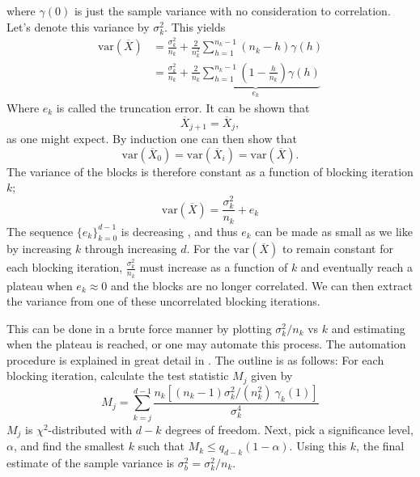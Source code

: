 \documentclass[
    a4paper, aps, twocolumn, floatfix, superscriptaddress,
    nofootinbib]{revtex4-1}
\begin{document}
where $\gamma(0)$ is just the sample variance with no consideration to correlation. Let's denote this variance by $\sigma_k^2$. This yields
\begin{align}
 \text{var}(\overline{X}) &= \frac{\sigma_k^2}{n_k} + \frac{2}{n_k^2} \sum_{h=1}^{n_k-1} (n_k-h)\gamma(h) \\
 &= \frac{\sigma_k^2}{n_k} + \underbrace{\frac{2}{n_k} \sum_{h=1}^{n_k-1}\left(1-\frac{h}{n_k} \right) \gamma(h)}_{e_k}
\end{align}
 Where $e_k$ is called the truncation error. It can be shown that \cite{Stat.Phys.}
 \begin{equation}
     \overline{X}_{j+1} = \overline{X}_{j},
 \end{equation}
 as one might expect. By induction one can then show that 
 \begin{equation}
     \text{var}(\overline{X}_0) = \text{var}(\overline{X}_i) = \text{var}(\overline{X}).
 \end{equation}
 The variance of the blocks is therefore constant as a function of blocking iteration $k$;
 \begin{equation}
     \text{var}(\overline{X}) = \frac{\sigma_k^2}{n_k} + e_k
 \end{equation}
 The sequence $\{e_k\}_{k=0}^{d-1}$ is decreasing \cite{Jonsson}, and thus $e_k$ can be made as small as we like by increasing $k$ through increasing $d$. For the $\text{var}(\overline{X})$ to remain constant for each blocking iteration, $\frac{\sigma_k^2}{n_k}$  must increase as a function of $k$ and eventually reach a plateau when $e_k \approx 0$ and the blocks are no longer correlated. We can then extract the variance from one of these uncorrelated blocking iterations. 
 
 This can be done in a brute force manner by plotting $\sigma_k^2/n_k$ vs $k$ and estimating when the plateau is reached, or one may automate this process. The automation procedure is explained in great detail in \cite{Stat.Phys.}. The outline is as follows: For each blocking iteration, calculate the test statistic $M_j$ given by 
 \begin{equation}
     M_j = \sum_{k=j}^{d-1}\frac{n_k\left[(n_k-1) \sigma_k^2/(n_k^2) \ \gamma_k(1) \right]}{\sigma_k^4}
 \end{equation}
$M_j$ is $\chi^2$-distributed with $d-k$ degrees of freedom. Next, pick a significance level, $\alpha$, and find the smallest $k$ such that $M_k \leq q_{d-k}(1-\alpha)$. Using this $k$, the final estimate of the sample variance is $\sigma_b^2 = \sigma_k^2/n_k$.
 
\end{document}
